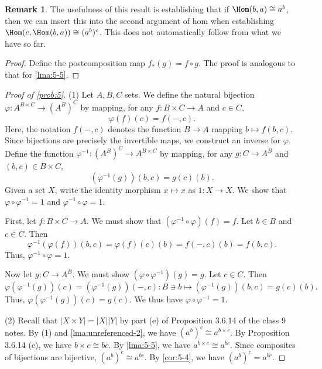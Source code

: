 \documentclass[11pt, letterpaper]{article}
\theoremstyle{definition}
\newtheorem*{remark*}{Remark}
\begin{document}
\begin{remark*}
	The usefulness of this result is establishing that if $\Hom(b,a) \cong a^b$, then we can insert this into the second argument of hom when establishing $\Hom(c,\Hom(b,a)) \cong (a^b)^c$. This does not automatically follow from what we have so far.
\end{remark*}
\begin{proof}
	Define the postcomposition map $f_*(g) = f\circ g$. The proof is analogous to that for \cref{lma:5-5}.
\end{proof}






\begin{proof}[Proof of \cref{prob:5}]
	(1) Let $A,B,C$ sets. We define the natural bijection $\varphi : A^{B\times C}  \to (A^B)^C$ by mapping, for any $f : B\times C \to A$ and $c\in C$,
	\[
		\varphi (f)(c) = f(-,c)
	.\]
	Here, the notation $f(-,c)$ denotes the function $B\to A$ mapping $b\mapsto f(b,c)$. Since bijections are precisely the invertible maps, we construct an inverse for $\varphi $. Define the function $\varphi ^{-1} : (A^B)^C \to A^{B\times C} $ by mapping, for any $g : C \to A^B$ and $(b,c)\in B\times C$,
	\[
		(\varphi ^{-1} (g))(b,c) = g(c)(b)
	.\]
	Given a set $X$, write the identity morphism $x\mapsto x$ as $1 : X \to X$. We show that $\varphi \circ \varphi ^{-1} =1$ and $\varphi ^{-1} \circ \varphi =1$.

	First, let $f : B\times C \to A$. We must show that $(\varphi ^{-1} \circ \varphi )(f)=f$. Let $b\in B$ and $c\in C$. Then
	\[
		\varphi ^{-1} (\varphi (f))(b,c) = \varphi (f)(c)(b) = f(-,c)(b) = f(b,c)
	.\]
	Thus, $\varphi ^{-1} \circ \varphi =1$.

	Now let $g : C \to A^B$. We must show $(\varphi \circ \varphi ^{-1} )(g)=g$. Let $c\in C$. Then
	\[
		\varphi (\varphi ^{-1} (g))(c) = (\varphi ^{-1} (g))(-,c) : B\ni b \mapsto (\varphi ^{-1} (g))(b,c) = g(c)(b)
	.\]
	Thus, $\varphi (\varphi ^{-1} (g))(c) = g(c)$. We thus have $\varphi \circ \varphi ^{-1} =1$.

	(2) Recall that $\left| X\times Y \right| =\left| X \right| \left| Y \right| $ by part (e) of Proposition 3.6.14 of the class 9 notes. By (1) and \cref{lma:unreferenced-2}, we have $(a^b)^c \cong a^{b\times c} $. By Proposition 3.6.14 (e), we have $b\times c \cong bc$. By \cref{lma:5-5}, we have $a^{b\times c} \cong a^{bc} $. Since composites of bijections are bijective, $(a^b)^c \cong a^{bc} $. By \cref{cor:5-4}, we have $(a^b)^c =a^{bc} $.


\end{proof}
\end{document}
